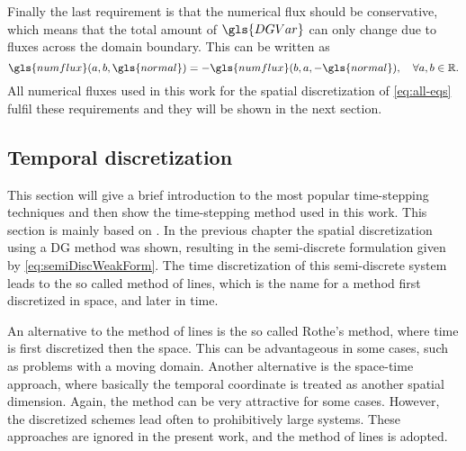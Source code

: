 Finally the last requirement is that the numerical flux should be conservative, which means that the total amount of $\gls{DGVar}$ can only change due to fluxes across the domain boundary. This can be written as
\begin{equation}
	\gls{numflux}(a,b,\gls{normal}) = 	-\gls{numflux}(b,a,-\gls{normal}), \quad \forall a,b \in \mathbb{R}. 
	\label{eq:conservativity}
\end{equation}
All numerical fluxes used in this work for the spatial discretization of \cref{eq:all-eqs} fulfil these requirements and they will be shown in the next section.
\subsection{Temporal discretization}\label{ssec:TemporalDiscretization}
This section will give a brief introduction to the most popular time-stepping techniques and then show the time-stepping method used in this work. This section is mainly based on \textcite{levequeFiniteVolumeMethods2002,ferzigerComputationalMethodsFluid2002}.
In the previous chapter the spatial discretization using a DG method was shown, resulting in the semi-discrete formulation given by \cref{eq:semiDiscWeakForm}. The time discretization of this semi-discrete system leads to the so called method of lines, which is the name for a method first discretized in space, and later in time.  

An alternative to the method of lines is the so called Rothe's method, where time is first discretized then the space. This can be advantageous in some cases, such as problems with a moving domain. Another alternative is the space-time approach, where basically the temporal coordinate is treated as another spatial dimension. Again, the method can be very attractive for some cases. However, the discretized schemes lead often to prohibitively large systems. These approaches are ignored in the present work, and the method of lines is adopted.

